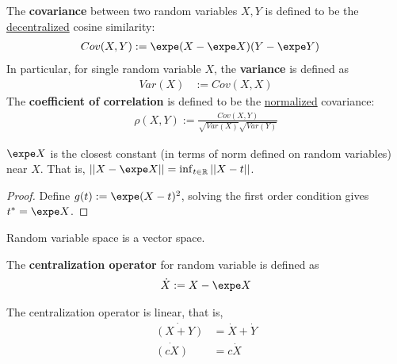 \documentclass{article}
\begin{document}
   	\begin{definition}
   		The \textbf{covariance} between two random variables $X, Y$ is defined to be the \ul{decentralized} cosine similarity:
   		\begin{align}
   			Cov(X, Y) &:= \expe (X - \expe X)(Y - \expe Y)
   		\end{align}
   		In particular, for single random variable $X$, the \textbf{variance} is defined as
   		\begin{align}
   			Var(X) &:= Cov(X, X)
   		\end{align}
   		The \textbf{coefficient of correlation} is defined to be the \ul{normalized} covariance:
   		\begin{align}
   			\rho(X, Y) := \frac{Cov(X, Y)}{\sqrt{Var(X)}\sqrt{Var(Y)}}
   		\end{align}
   	\end{definition}
   	
   	\begin{proposition}
   		$\expe X$ is the closest constant (in terms of norm defined on random variables) near $X$. That is, $\norm{X - \expe X} = \inf_{t \in \R} \norm{X - t}$.
   	\end{proposition}
   	
   	\begin{proof}
   		Define $g(t) := \expe (X - t)^2$, solving the first order condition gives $t^* = \expe X$.
   	\end{proof}

   	\begin{proposition}
   		Random variable space is a vector space.
   	\end{proposition}

   	\begin{definition}
   		The \textbf{centralization operator} for random variable is defined as
   		\begin{align}
   			\dot{X} := X - \expe X
   		\end{align}
   	\end{definition}
   	
   	\begin{proposition}
   		The centralization operator is linear, that is,
   		\begin{align}
   			\dot{(X + Y)} &= \dot{X} + \dot{Y} \\
   			\dot{(cX)} &= c \dot{X}
   		\end{align}
   	\end{proposition}
   	
\end{document}

